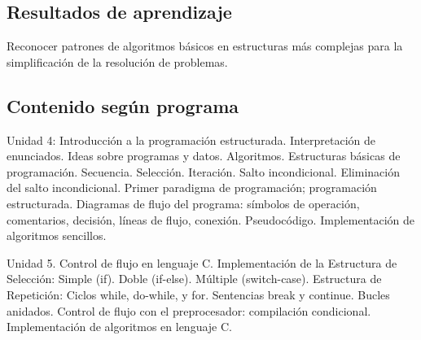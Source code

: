 \subsection*{Resultados de aprendizaje}
Reconocer patrones de algoritmos básicos en estructuras más complejas para la simplificación de la resolución de problemas.

\subsection*{Contenido según programa}
Unidad 4: Introducción a la programación estructurada.  Interpretación de enunciados. Ideas sobre programas y datos.  Algoritmos. Estructuras básicas de programación.  Secuencia. Selección.  Iteración. Salto incondicional. Eliminación del salto incondicional.  Primer paradigma de programación; programación estructurada.  Diagramas de flujo del programa: símbolos de operación, comentarios, decisión, líneas de flujo, conexión. Pseudocódigo.  Implementación de algoritmos sencillos.

Unidad 5. Control de flujo en lenguaje C.  Implementación de la Estructura de Selección: Simple (if). Doble (if-else).  Múltiple (switch-case).  Estructura de Repetición: Ciclos while, do-while, y for.  Sentencias break y continue. Bucles anidados.  Control de flujo con el preprocesador: compilación condicional. Implementación de algoritmos en lenguaje C.